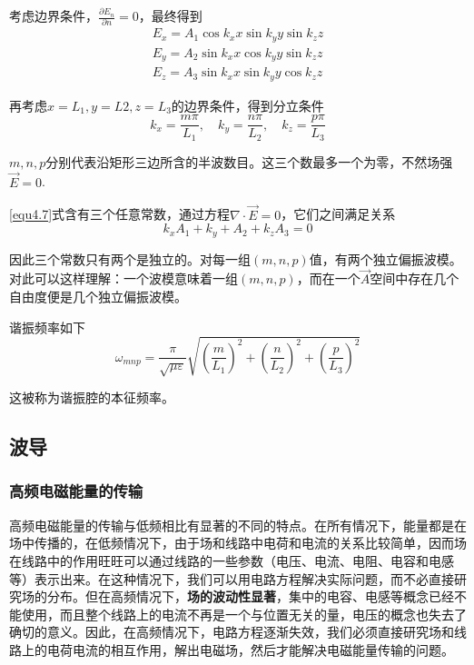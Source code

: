 \documentclass[UTF8]{ctexart}
\begin{document}
\noindent 考虑边界条件，$\frac{\partial E_n}{\partial n} = 0$，最终得到
\begin{equation}
\begin{array}{l}{E_{x}=A_{1} \cos k_{x} x \sin k_{y} y \sin k_{z} z} \\ {E_{y}=A_{2} \sin k_{x} x \cos k_{y} y \sin k_{z} z} \\ {E_{z}=A_{3} \sin k_{x} x \sin k_{y} y \cos k_{z} z}\end{array} \label{equ4.7}
\end{equation}

\noindent 再考虑$x=L_1,y=L2,z=L_3$的边界条件，得到分立条件
\begin{equation}
    k_x = \frac{m \pi}{L_1}, \quad k_y = \frac{n \pi }{L_2} , \quad k_z = \frac{p \pi }{L_3}
\end{equation}

\noindent $m,n,p$分别代表沿矩形三边所含的半波数目。这三个数最多一个为零，不然场强$\vec{E} = 0$.

    \autoref{equ4.7}式含有三个任意常数，通过方程$\nabla \cdot \vec{E} = 0$，它们之间满足关系
    \begin{equation}
        k_x A_1 + k_y + A_2 + k_z A_3 =0
    \end{equation}

\noindent 因此三个常数只有两个是独立的。对每一组$(m,n,p)$值，有两个独立偏振波模。对此可以这样理解：一个波模意味着一组$(m,n,p)$，而在一个$\vec{A}$空间中存在几个自由度便是几个独立偏振波模。

    谐振频率如下
    \begin{equation}
        \omega_{mnp} = \frac{\pi}{\sqrt{\mu \varepsilon}} \sqrt{\left(\frac{m}{L_1}\right)^2 + \left(\frac{n}{L_2}\right)^2+\left(\frac{p}{L_3}\right)^2}
    \end{equation}

\noindent 这被称为谐振腔的本征频率。

    \subsection{波导}
    \subsubsection{高频电磁能量的传输}
    高频电磁能量的传输与低频相比有显著的不同的特点。在所有情况下，能量都是在场中传播的，在低频情况下，由于场和线路中电荷和电流的关系比较简单，因而场在线路中的作用旺旺可以通过线路的一些参数（电压、电流、电阻、电容和电感等）表示出来。在这种情况下，我们可以用电路方程解决实际问题，而不必直接研究场的分布。但在高频情况下，\textbf{场的波动性显著}，集中的电容、电感等概念已经不能使用，而且整个线路上的电流不再是一个与位置无关的量，电压的概念也失去了确切的意义。因此，在高频情况下，电路方程逐渐失效，我们必须直接研究场和线路上的电荷电流的相互作用，解出电磁场，然后才能解决电磁能量传输的问题。
\end{document}
